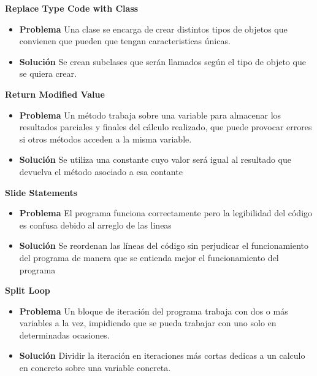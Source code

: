 \documentclass[11pt,a4paper,oneside]{book}
\begin{document}
\textbf{Replace Type Code with Class}
\label{replaceSuperclassWithDelegate}
\begin{itemize}
    \item \textbf{Problema} Una clase se encarga de crear distintos tipos de objetos que convienen que pueden que tengan caracteristicas únicas.
    
    
    \item \textbf{Solución} Se crean subclases que serán llamados según el tipo de objeto que se quiera crear.
    
\end{itemize}

\textbf{Return Modified Value}
\label{returnModifiedValue}
\begin{itemize}
    \item \textbf{Problema} Un método trabaja sobre una variable para almacenar los resultados parciales y finales del cálculo realizado, que puede provocar errores si otros métodos acceden a la misma variable.
    
    
    \item \textbf{Solución} Se utiliza una constante cuyo valor será igual al resultado que devuelva el método asociado a esa contante
    
\end{itemize}

\textbf{Slide Statements}
\label{slideStatements}
\begin{itemize}
    \item \textbf{Problema} El programa funciona correctamente pero la legibilidad del código es confusa debido al arreglo de las lineas 
    
    
    \item \textbf{Solución} Se reordenan las líneas del código sin perjudicar el funcionamiento del programa de manera que se entienda mejor el funcionamiento del programa
    
\end{itemize}

\textbf{Split Loop}
\label{splitLoop}
\begin{itemize}
    \item \textbf{Problema} Un bloque de iteración del programa trabaja con dos o más variables a la vez, impidiendo que se pueda trabajar con uno solo en determinadas ocasiones.
    
    
    \item \textbf{Solución} Dividir la iteración en iteraciones más cortas dedicas a un calculo en concreto sobre una variable concreta.
    
\end{itemize}
\end{document}
